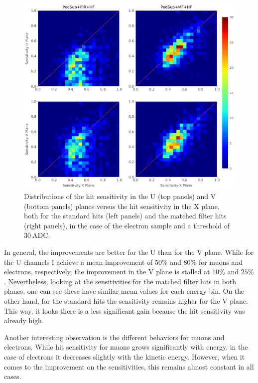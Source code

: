 \begin{figure}[t]
	\centering
	\includegraphics[width=.99\linewidth]{Images/Matched_Filter/hit_study_electron_concurrence}
	\caption[Distributions of the hit sensitivity in the U and V planes versus the sensitivity in the X plane for the standard hits and the matched filter hits in the electron sample.]{Distributions of the hit sensitivity in the U (top panels) and V (bottom panels) planes versus the hit sensitivity in the X plane, both for the standard hits (left panels) and the matched filter hits (right panels), in the case of the electron sample and a threshold of $30 \ \mathrm{ADC}$.}
	\label{fig:electron_concurrence}
\end{figure}

In general, the improvements are better for the U than for the V plane. While for the U channels I achieve a mean improvement of $50\%$ and $80\%$ for muons and electrons, respectively, the improvement in the V plane is stalled at $10\%$ and $25\%$. Nevertheless, looking at the sensitivities for the matched filter hits in both planes, one can see these have similar mean values for each energy bin. On the other hand, for the standard hits the sensitivity remains higher for the V plane. This way, it looks there is a less significant gain because the hit sensitivity was already high.

Another interesting observation is the different behaviors for muons and electrons. While hit sensitivity for muons grows significantly with energy, in the case of electrons it decreases slightly with the kinetic energy. However, when it comes to the improvement on the sensitivities, this remains almost constant in all cases.

